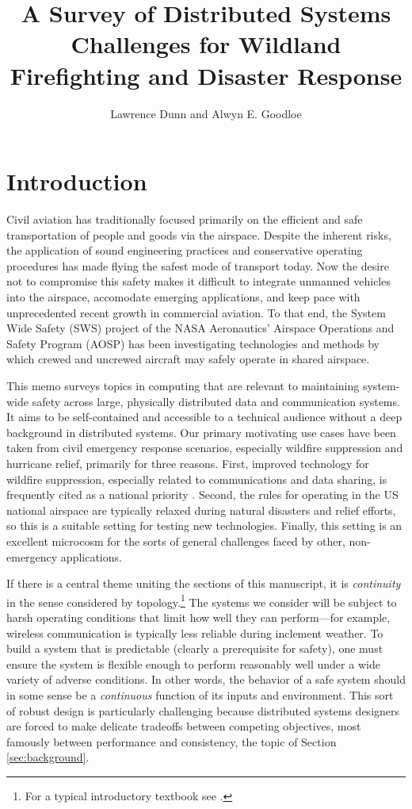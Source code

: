 \documentclass[]             %
{NASA}                       %
\title{A Survey of Distributed Systems Challenges for Wildland
  Firefighting and Disaster Response}
\author{Lawrence Dunn and Alwyn E. Goodloe}
\theoremstyle{definition}
\begin{document}
\newpage
\setcounter{tocdepth}{2}
\tableofcontents
\newpage

\section{Introduction}\label{introduction}

Civil aviation has traditionally focused primarily on the efficient
and safe transportation of people and goods via the airspace. Despite
the inherent risks, the application of sound engineering practices and
conservative operating procedures has made flying the safest mode of
transport today. Now the desire not to compromise this safety makes it
difficult to integrate unmanned vehicles into the airspace, accomodate
emerging applications, and keep pace with unprecedented recent growth
in commercial aviation. To that end, the System Wide Safety (SWS)
project of the NASA Aeronautics' Airspace Operations and Safety
Program (AOSP) has been investigating technologies and methods by
which crewed and uncrewed aircraft may safely operate in shared
airspace.

This memo surveys topics in computing that are relevant to maintaining
system-wide safety across large, physically distributed data and
communication systems. It aims to be self-contained and accessible to
a technical audience without a deep background in distributed
systems. Our primary motivating use cases have been taken from civil
emergency response scenarios, especially wildfire suppression and
hurricane relief, primarily for three reasons. First, improved
technology for wildfire suppression, especially related to
communications and data sharing, is frequently cited as a national
priority \cite{pcast2023}.  Second, the rules for operating in the US
national airspace are typically relaxed during natural disasters and
relief efforts, so this is a suitable setting for testing new
technologies. Finally, this setting is an excellent microcosm for the
sorts of general challenges faced by other, non-emergency
applications.

If there is a central theme uniting the sections of this manuscript,
it is \emph{continuity} in the sense considered by
topology.\footnote{For a typical introductory textbook see
\cite{mendelson2012introduction}.} The systems we consider will be
subject to harsh operating conditions that limit how well they can
perform---for example, wireless communication is typically less
reliable during inclement weather. To build a system that is
predictable (clearly a prerequisite for safety), one must ensure the
system is flexible enough to perform reasonably well under a wide
variety of adverse conditions. In other words, the behavior of a safe
system should in some sense be a \emph{continuous} function of its
inputs and environment. This sort of robust design is particularly
challenging because distributed systems designers are forced to make
delicate tradeoffs between competing objectives, most famously between
performance and consistency, the topic of Section
\ref{sec:background}.
\end{document}

